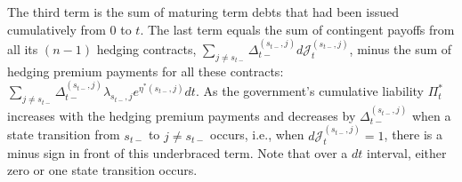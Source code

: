 \documentclass[12pt]{article}
\begin{document}
The third term is the sum of maturing term debts that had been    issued cumulatively from 0 to $t$.  %
The last  term equals the sum of contingent payoffs from all its $(n-1)$ hedging contracts, $\sum_{j\neq s_{t-}} \Delta_{t-}^{(s_{t-}, j)} d {\mathcal J}_t^{(s_{t-}, j)}$, minus the sum of hedging premium payments for all these contracts:  $\sum_{j\neq s_{t-}} \Delta_{t-}^{(s_{t-}, j)} \lambda_{s_{t-}, j}e^{\eta^*(s_{t-}, j)}d t . $ As the government's cumulative liability $\Pi_t^\ast$ increases with the hedging premium payments and decreases by $\Delta_{t-}^{(s_{t-}, j)}$ when a state transition from $s_{t-}$ to $j\neq s_{t-}$ occurs, i.e., when $d {\mathcal J}_t^{(s_{t-}, j)}=1$, there is a minus sign in front of this underbraced term.  
Note that over a $dt$ interval, either zero  or one state transition occurs. 

\end{document}
